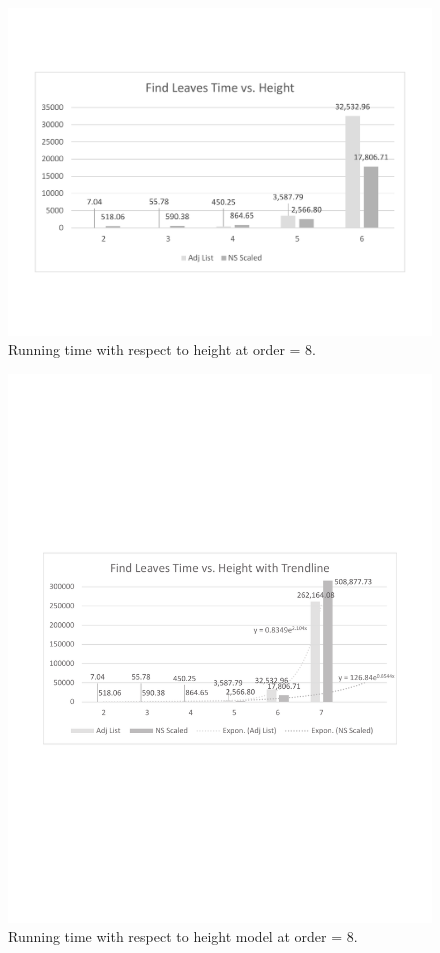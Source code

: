 \begin{figure}
\begin{center}
\includegraphics[width=6in]{images/eval/leaves/height/col.pdf}
\caption{Running time with respect to height at order = 8.\label{fig-leaves-height1}}
\end{center}
\end{figure}

\begin{figure}
\begin{center}
\includegraphics[width=6in]{images/eval/leaves/height/col_trend.pdf}
\caption{Running time with respect to height model at order = 8.\label{fig-leaves-height2}}
\end{center}
\end{figure}


